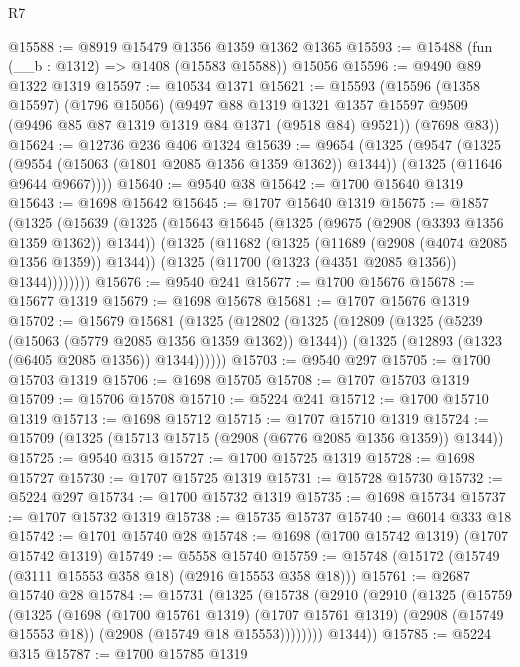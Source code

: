 \begin{lexlean}{R7}
\begin{coremodule}
@15588 := @8919 @15479 @1356 @1359 @1362 @1365
@15593 := @15488 (fun (__b : @1312) => @1408 (@15583 @15588)) @15056
@15596 := @9490 @89 @1322 @1319
@15597 := @10534 @1371
@15621 := @15593
    (@15596
      (@1358 @15597)
      (@1796 @15056)
      (@9497
        @88
        @1319
        @1321
        @1357
        @15597
        @9509
        (@9496 @85 @87 @1319 @1319 @84 @1371 (@9518 @84) @9521))
      (@7698 @83))
@15624 := @12736 @236 @406 @1324
@15639 := @9654
    (@1325
      (@9547
        (@1325 (@9554 (@15063 (@1801 @2085 @1356 @1359 @1362)) @1344))
        (@1325 (@11646 @9644 @9667))))
@15640 := @9540 @38
@15642 := @1700 @15640 @1319
@15643 := @1698 @15642
@15645 := @1707 @15640 @1319
@15675 := @1857
    (@1325
      (@15639
        (@1325
          (@15643
            @15645
            (@1325 (@9675 (@2908 (@3393 @1356 @1359 @1362)) @1344))
            (@1325
              (@11682
                (@1325 (@11689 (@2908 (@4074 @2085 @1356 @1359)) @1344))
                (@1325 (@11700 (@1323 (@4351 @2085 @1356)) @1344))))))))
@15676 := @9540 @241
@15677 := @1700 @15676
@15678 := @15677 @1319
@15679 := @1698 @15678
@15681 := @1707 @15676 @1319
@15702 := @15679
    @15681
    (@1325
      (@12802
        (@1325
          (@12809
            (@1325 (@5239 (@15063 (@5779 @2085 @1356 @1359 @1362)) @1344))
            (@1325 (@12893 (@1323 (@6405 @2085 @1356)) @1344))))))
@15703 := @9540 @297
@15705 := @1700 @15703 @1319
@15706 := @1698 @15705
@15708 := @1707 @15703 @1319
@15709 := @15706 @15708
@15710 := @5224 @241
@15712 := @1700 @15710 @1319
@15713 := @1698 @15712
@15715 := @1707 @15710 @1319
@15724 := @15709 (@1325 (@15713 @15715 (@2908 (@6776 @2085 @1356 @1359)) @1344))
@15725 := @9540 @315
@15727 := @1700 @15725 @1319
@15728 := @1698 @15727
@15730 := @1707 @15725 @1319
@15731 := @15728 @15730
@15732 := @5224 @297
@15734 := @1700 @15732 @1319
@15735 := @1698 @15734
@15737 := @1707 @15732 @1319
@15738 := @15735 @15737
@15740 := @6014 @333 @18
@15742 := @1701 @15740 @28
@15748 := @1698 (@1700 @15742 @1319) (@1707 @15742 @1319)
@15749 := @5558 @15740
@15759 := @15748 (@15172 (@15749 (@3111 @15553 @358 @18) (@2916 @15553 @358 @18)))
@15761 := @2687 @15740 @28
@15784 := @15731
    (@1325
      (@15738
        (@2910
          (@2910
            (@1325
              (@15759
                (@1325
                  (@1698
                    (@1700 @15761 @1319)
                    (@1707 @15761 @1319)
                    (@2908 (@15749 @15553 @18))
                    (@2908 (@15749 @18 @15553))))))))
        @1344))
@15785 := @5224 @315
@15787 := @1700 @15785 @1319

\end{coremodule}
\end{lexlean}
